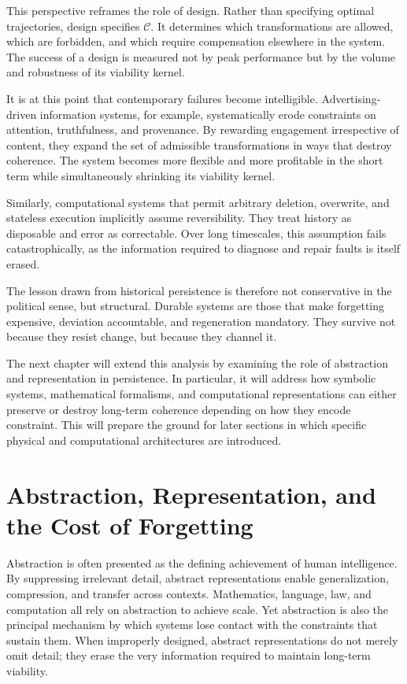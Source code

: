 \documentclass[12pt,oneside]{book}
\begin{document}
This perspective reframes the role of design. Rather than specifying optimal trajectories, design specifies \(\mathcal{C}\). It determines which transformations are allowed, which are forbidden, and which require compensation elsewhere in the system. The success of a design is measured not by peak performance but by the volume and robustness of its viability kernel.

It is at this point that contemporary failures become intelligible. Advertising-driven information systems, for example, systematically erode constraints on attention, truthfulness, and provenance. By rewarding engagement irrespective of content, they expand the set of admissible transformations in ways that destroy coherence. The system becomes more flexible and more profitable in the short term while simultaneously shrinking its viability kernel.

Similarly, computational systems that permit arbitrary deletion, overwrite, and stateless execution implicitly assume reversibility. They treat history as disposable and error as correctable. Over long timescales, this assumption fails catastrophically, as the information required to diagnose and repair faults is itself erased.

The lesson drawn from historical persistence is therefore not conservative in the political sense, but structural. Durable systems are those that make forgetting expensive, deviation accountable, and regeneration mandatory. They survive not because they resist change, but because they channel it.

The next chapter will extend this analysis by examining the role of abstraction and representation in persistence. In particular, it will address how symbolic systems, mathematical formalisms, and computational representations can either preserve or destroy long-term coherence depending on how they encode constraint. This will prepare the ground for later sections in which specific physical and computational architectures are introduced.

\chapter{Abstraction, Representation, and the Cost of Forgetting}

Abstraction is often presented as the defining achievement of human intelligence. By suppressing irrelevant detail, abstract representations enable generalization, compression, and transfer across contexts. Mathematics, language, law, and computation all rely on abstraction to achieve scale. Yet abstraction is also the principal mechanism by which systems lose contact with the constraints that sustain them. When improperly designed, abstract representations do not merely omit detail; they erase the very information required to maintain long-term viability.
\end{document}
